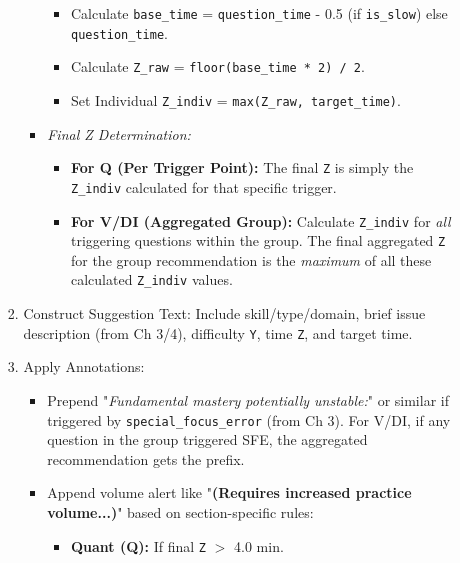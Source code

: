 \documentclass{article}
\begin{document}
\begin{enumerate}
\begin{itemize}
\begin{enumerate}
\begin{itemize}
\begin{itemize}
                                \item Calculate \texttt{base\_time} = \texttt{question\_time} - 0.5 (if \texttt{is\_slow}) else \texttt{question\_time}.
                                \item Calculate \texttt{Z\_raw} = \texttt{floor(base\_time * 2) / 2}.
                                \item Set Individual \texttt{Z\_indiv} = \texttt{max(Z\_raw, target\_time)}.
                            \end{itemize}
                        \item \textit{Final Z Determination:}
                            \begin{itemize}
                                \item \textbf{For Q (Per Trigger Point):} The final \texttt{Z} is simply the \texttt{Z\_indiv} calculated for that specific trigger.
                                \item \textbf{For V/DI (Aggregated Group):} Calculate \texttt{Z\_indiv} for \textit{all} triggering questions within the group. The final aggregated \texttt{Z} for the group recommendation is the \textit{maximum} of all these calculated \texttt{Z\_indiv} values.
                            \end{itemize}
                    \end{itemize}
                \item Construct Suggestion Text: Include skill/type/domain, brief issue description (from Ch 3/4), difficulty \texttt{Y}, time \texttt{Z}, and target time.
                \item Apply Annotations:
                    \begin{itemize}
                        \item Prepend "\textit{Fundamental mastery potentially unstable:}" or similar if triggered by \texttt{special\_focus\_error} (from Ch 3). For V/DI, if any question in the group triggered SFE, the aggregated recommendation gets the prefix.
                        \item Append volume alert like "\textbf{(Requires increased practice volume...)}" based on section-specific rules:
                        \newpage
                            \begin{itemize}
                                \item \textbf{Quant (Q):} If final \texttt{Z} $>$ 4.0 min. %

\end{itemize}
\end{itemize}
\end{enumerate}
\end{itemize}
\end{enumerate}
\end{document}
